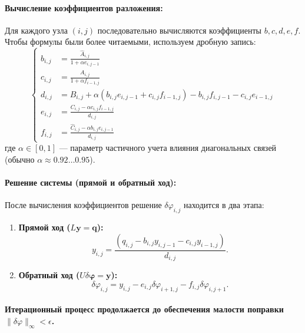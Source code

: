 	\paragraph{Вычисление коэффициентов разложения:}
	Для каждого узла $(i,j)$ последовательно вычисляются коэффициенты $b, c, d, e, f$. Чтобы формулы были более читаемыми, используем дробную запись:
	\begin{equation}
		\displaystyle
		\left\{
		\begin{aligned}
			b_{i,j} &= \frac{\hat{A}_{i,j}}{1 + \alpha e_{i,j-1}} \\[10pt]
			c_{i,j} &= \frac{A_{i,j}}{1 + \alpha f_{i-1,j}} \\[10pt]
			d_{i,j} &= B_{i,j} + \alpha (b_{i,j} e_{i,j-1} + c_{i,j} f_{i-1,j}) - b_{i,j} f_{i,j-1} - c_{i,j} e_{i-1,j} \\[10pt]
			e_{i,j} &= \frac{C_{i,j} - \alpha c_{i,j} f_{i-1,j}}{d_{i,j}} \\[10pt]
			f_{i,j} &= \frac{\hat{C}_{i,j} - \alpha b_{i,j} e_{i,j-1}}{d_{i,j}}
		\end{aligned}
		\right.
	\end{equation}
	где $\alpha \in [0, 1]$ — параметр частичного учета влияния диагональных связей (обычно $\alpha \approx 0.92 \dots 0.95$).
	
	\paragraph{Решение системы (прямой и обратный ход):}
	После вычисления коэффициентов решение $\delta \varphi_{i,j}$ находится в два этапа:
	\begin{enumerate}
		\item \textbf{Прямой ход ($L\mathbf{y} = \mathbf{q}$):}
		\[ y_{i,j} = \frac{(q_{i,j} - b_{i,j} y_{i,j-1} - c_{i,j} y_{i-1,j})}{d_{i,j}}  . \]
		\item \textbf{Обратный ход ($U \delta \boldsymbol{\varphi} = \mathbf{y}$):}
		\[ \delta \varphi_{i,j} = y_{i,j} - e_{i,j} \delta \varphi_{i+1,j} - f_{i,j} \delta \varphi_{i,j+1}. \]
	\end{enumerate}
	
	\paragraph{Итерационный процесс продолжается до обеспечения малости поправки $\|\delta \varphi\|_\infty < \epsilon$.}
	

